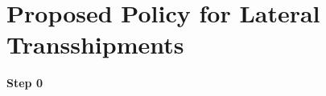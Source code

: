 \documentclass[../../main.tex]{subfiles}
\begin{document}

\section{Proposed Policy for Lateral Transshipments}

\textbf{Step 0}



\end{document}

